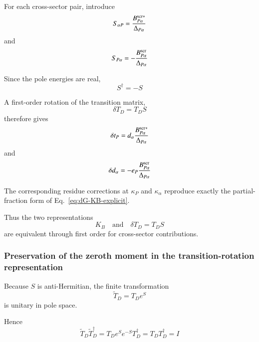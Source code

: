 \documentclass[aip,jcp,reprint,noshowkeys,superscriptaddress]{revtex4-1}
\begin{document}
For each cross-sector pair, introduce
\begin{equation}
  S_{\alpha P}
  =
  \frac{
    B_{P\alpha}^{{\rm scr}*}
  }{
    \Delta_{P\alpha}
  }
  \label{eq:S-alphaP}
\end{equation}
and
\begin{equation}
  S_{P\alpha}
  =
  -
  \frac{
    B_{P\alpha}^{\rm scr}
  }{
    \Delta_{P\alpha}
  }
  \label{eq:S-Palpha}
\end{equation}

Since the pole energies are real,
\begin{equation}
  S^\dagger=-S
  \label{eq:S-antihermitian}
\end{equation}

A first-order rotation of the transition matrix,
\begin{equation}
  \delta T_D
  =
  T_DS
  \label{eq:dT-TS}
\end{equation}
therefore gives
\begin{equation}
  \delta t_P
  =
  d_\alpha
  \frac{
    B_{P\alpha}^{{\rm scr}*}
  }{
    \Delta_{P\alpha}
  }
\end{equation}
and
\begin{equation}
  \delta d_\alpha
  =
  -
  e_P
  \frac{
    B_{P\alpha}^{\rm scr}
  }{
    \Delta_{P\alpha}
  }
\end{equation}

The corresponding residue corrections at $\kappa_P$ and
$\kappa_\alpha$ reproduce exactly the partial-fraction form of
Eq.~\eqref{eq:dG-KB-explicit}.

Thus the two representations
\begin{equation}
  K_B
  \quad\text{and}\quad
  \delta T_D=T_DS
\end{equation}
are equivalent through first order for cross-sector contributions.


\subsubsection{Preservation of the zeroth moment in the transition-rotation representation}

Because $S$ is anti-Hermitian, the finite transformation
\begin{equation}
  \widetilde T_D
  =
  T_De^S
  \label{eq:T-unitary-rotation}
\end{equation}
is unitary in pole space.

Hence
\begin{equation}
  \widetilde T_D
  \widetilde T_D^\dagger
  =
  T_De^Se^{-S}T_D^\dagger
  =
  T_DT_D^\dagger
  =
  I
\end{equation}
\end{document}

